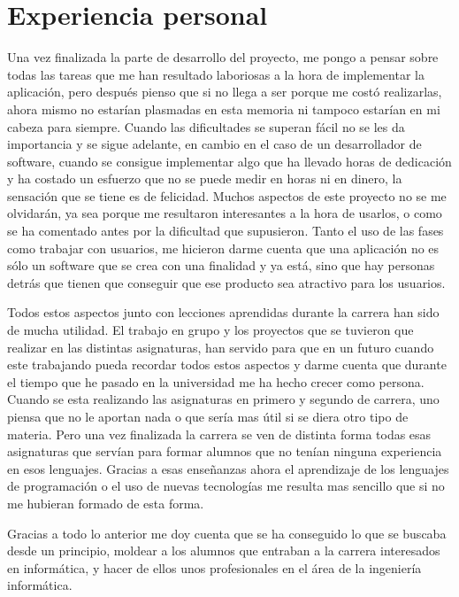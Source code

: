 \section{Experiencia personal}
\label{secc:Experiencia personal}

Una vez finalizada la parte de desarrollo del proyecto, me pongo a pensar sobre todas las tareas que me han resultado laboriosas a la hora de implementar la aplicación, pero después pienso que si no llega a ser porque me costó realizarlas, ahora mismo no estarían plasmadas en esta memoria ni tampoco estarían en mi cabeza para siempre. Cuando las dificultades se superan fácil no se les da importancia y se sigue adelante, en cambio en el caso de un desarrollador de software, cuando se consigue implementar algo que ha llevado horas de dedicación y ha costado un esfuerzo que no se puede medir en horas ni en dinero, la sensación que se tiene es de felicidad. Muchos aspectos de este proyecto no se me olvidarán, ya sea porque me resultaron interesantes a la hora de usarlos, o como se ha comentado antes por la dificultad que supusieron. Tanto el uso de las fases como trabajar con usuarios, me hicieron darme cuenta que una aplicación no es sólo un software que se crea con una finalidad y ya está, sino que hay personas detrás que tienen que conseguir que ese producto sea atractivo para los usuarios. 

Todos estos aspectos junto con lecciones aprendidas durante la carrera han sido de mucha utilidad. El trabajo en grupo y los proyectos que se tuvieron que realizar en las distintas asignaturas, han servido para que en un futuro cuando este trabajando pueda recordar todos estos aspectos y darme cuenta que durante el tiempo que he pasado en la universidad me ha hecho crecer como persona.
Cuando se esta realizando las asignaturas en primero y segundo de carrera, uno piensa que no le aportan nada o que sería mas útil si se diera otro tipo de materia. Pero una vez finalizada la carrera se ven de distinta forma todas esas asignaturas que servían para formar alumnos que no tenían ninguna experiencia en esos lenguajes. Gracias a esas enseñanzas ahora el aprendizaje de los lenguajes de programación o el uso de nuevas tecnologías me resulta mas sencillo que si no me hubieran formado de esta forma.

Gracias a todo lo anterior me doy cuenta que se ha conseguido lo que se buscaba desde un principio, moldear a los alumnos que entraban a la carrera interesados en informática, y hacer de ellos unos profesionales en el área de la ingeniería informática.



